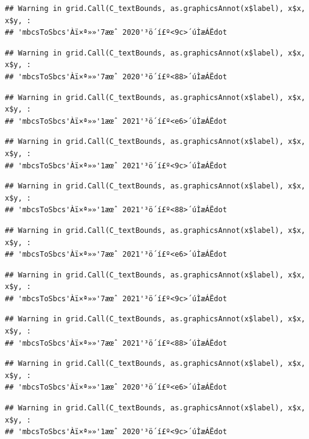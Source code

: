 \documentclass[
]{book}
\begin{document}
\begin{verbatim}
## Warning in grid.Call(C_textBounds, as.graphicsAnnot(x$label), x$x, x$y, :
## 'mbcsToSbcs'Àï×ª»»'7æœˆ 2020'³ö´í£º<9c>´úÌæÁËdot
\end{verbatim}

\begin{verbatim}
## Warning in grid.Call(C_textBounds, as.graphicsAnnot(x$label), x$x, x$y, :
## 'mbcsToSbcs'Àï×ª»»'7æœˆ 2020'³ö´í£º<88>´úÌæÁËdot
\end{verbatim}

\begin{verbatim}
## Warning in grid.Call(C_textBounds, as.graphicsAnnot(x$label), x$x, x$y, :
## 'mbcsToSbcs'Àï×ª»»'1æœˆ 2021'³ö´í£º<e6>´úÌæÁËdot
\end{verbatim}

\begin{verbatim}
## Warning in grid.Call(C_textBounds, as.graphicsAnnot(x$label), x$x, x$y, :
## 'mbcsToSbcs'Àï×ª»»'1æœˆ 2021'³ö´í£º<9c>´úÌæÁËdot
\end{verbatim}

\begin{verbatim}
## Warning in grid.Call(C_textBounds, as.graphicsAnnot(x$label), x$x, x$y, :
## 'mbcsToSbcs'Àï×ª»»'1æœˆ 2021'³ö´í£º<88>´úÌæÁËdot
\end{verbatim}

\begin{verbatim}
## Warning in grid.Call(C_textBounds, as.graphicsAnnot(x$label), x$x, x$y, :
## 'mbcsToSbcs'Àï×ª»»'7æœˆ 2021'³ö´í£º<e6>´úÌæÁËdot
\end{verbatim}

\begin{verbatim}
## Warning in grid.Call(C_textBounds, as.graphicsAnnot(x$label), x$x, x$y, :
## 'mbcsToSbcs'Àï×ª»»'7æœˆ 2021'³ö´í£º<9c>´úÌæÁËdot
\end{verbatim}

\begin{verbatim}
## Warning in grid.Call(C_textBounds, as.graphicsAnnot(x$label), x$x, x$y, :
## 'mbcsToSbcs'Àï×ª»»'7æœˆ 2021'³ö´í£º<88>´úÌæÁËdot
\end{verbatim}

\begin{verbatim}
## Warning in grid.Call(C_textBounds, as.graphicsAnnot(x$label), x$x, x$y, :
## 'mbcsToSbcs'Àï×ª»»'1æœˆ 2020'³ö´í£º<e6>´úÌæÁËdot
\end{verbatim}

\begin{verbatim}
## Warning in grid.Call(C_textBounds, as.graphicsAnnot(x$label), x$x, x$y, :
## 'mbcsToSbcs'Àï×ª»»'1æœˆ 2020'³ö´í£º<9c>´úÌæÁËdot
\end{verbatim}
\end{document}
